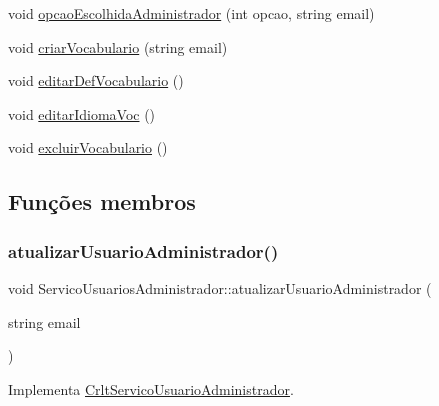 \begin{DoxyCompactItemize}
\item 
void \mbox{\hyperlink{class_servico_usuarios_administrador_abf155b3f2f19bf2ab2e3329a1587c750}{opcao\+Escolhida\+Administrador}} (int opcao, string email)
\item 
void \mbox{\hyperlink{class_servico_usuarios_administrador_a87f2dca2e2b3858f663b4220f357d26f}{criar\+Vocabulario}} (string email)
\item 
void \mbox{\hyperlink{class_servico_usuarios_administrador_a57d5f777ed99a006dc2db5cdb0f135b1}{editar\+Def\+Vocabulario}} ()
\item 
void \mbox{\hyperlink{class_servico_usuarios_administrador_ac0d400904b25cd30911a446bce66603a}{editar\+Idioma\+Voc}} ()
\item 
void \mbox{\hyperlink{class_servico_usuarios_administrador_a13237b760df88f3f8a825a5bcd1d7331}{excluir\+Vocabulario}} ()
\end{DoxyCompactItemize}


\subsection{Funções membros}
\mbox{\label{class_servico_usuarios_administrador_a1111b56d40dff5aa7186c4f3dfe2e598}} 
\subsubsection{\texorpdfstring{atualizar\+Usuario\+Administrador()}{atualizarUsuarioAdministrador()}}
{\footnotesize\ttfamily void Servico\+Usuarios\+Administrador\+::atualizar\+Usuario\+Administrador (\begin{DoxyParamCaption}\item[{string}]{email }\end{DoxyParamCaption})\hspace{0.3cm}{\ttfamily [virtual]}}



Implementa \mbox{\hyperlink{class_crlt_servico_usuario_administrador_ab0492870331c189997ea174f0482202e}{Crlt\+Servico\+Usuario\+Administrador}}.


